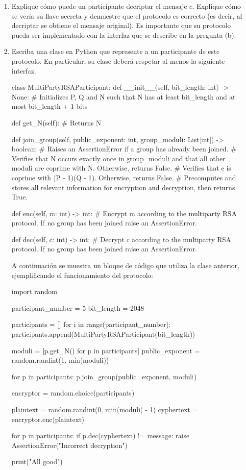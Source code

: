 \begin{enumerate}
	\item \text{[2 puntos]} Explique cómo puede un participante decriptar el mensaje $c$. Explique cómo se vería su llave secreta y demuestre que el protocolo es correcto (es decir, al decriptar se obtiene el mensaje original). Es importante que su protocolo pueda ser implementado con la interfaz que se describe en la pregunta (b).
	\item \text{[4 puntos]} Escriba una clase en Python que represente a un participante de este protocolo. En particular, su clase deberá respetar al menos la siguiente interfaz.
	\begin{python}
	class MultiPartyRSAParticipant:
		def __init__(self, bit_length: int) -> None:
			# Initializes P, Q and N such that N has at least bit_length and at most bit_length + 1 bits

		def get_N(self):
			# Returns N

		def join_group(self, public_exponent: int, group_moduli: List[int]) -> boolean:
      # Raises an AssertionError if a group has already been joined.
			# Verifies that N occurs exactly once in group_moduli and that all other moduli are coprime with N. Otherwise, returns False.
			# Verifies that e is coprime with (P - 1)(Q - 1). Otherwise, returns False.
			# Precomputes and stores all relevant information for encryption and decryption, then returns True.

		def enc(self, m: int) -> int:
			# Encrypt m according to the multiparty RSA protocol. If no group has been joined raise an AssertionError.
		
		def dec(self, c: int) -> int:
			# Decrypt c according to the multiparty RSA protocol. If no group has been joined raise an AssertionError.
	\end{python}


	A continuación se muestra un bloque de código que utiliza la clase anterior, ejemplificando el funcionamiento del protocolo:

	\begin{python}
		import random

		participant_number = 5
		bit_length = 2048

		participants = []
		for i in range(participant_number):
			participants.append(MultiPartyRSAParticipant(bit_length))

		moduli = [p.get_N() for p in participants]
		public_exponent = random.randint(1, min(moduli))

		for p in participants:
			p.join_group(public_exponent, moduli)

		encryptor = random.choice(participants)

		plaintext = random.randint(0, min(moduli) - 1)
		cyphertext = encryptor.enc(plaintext)

		for p in participants:
			if p.dec(cyphertext) != message:
				raise AssertionError("Incorrect decryption")

		print("All good")
		
	\end{python}
\end{enumerate}
